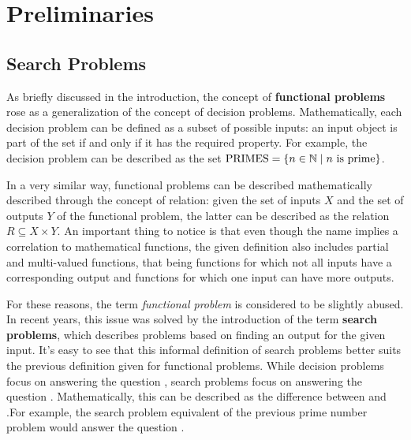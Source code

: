 \hypersetup{colorlinks=true, linkcolor=blue, citecolor=red}

\chapter{Preliminaries} \label{chap:preliminaries}

\section{Search Problems}

As briefly discussed in the introduction, the concept of \textbf{functional problems} rose as a generalization of the concept of decision problems. Mathematically, each decision problem can be defined as a subset of possible inputs: an input object is part of the set if and only if it has the required property. For example, the decision problem  can be described as the set $\mathrm{PRIMES} = \{n \in \mathbb{N} \mid n \text{ is prime}\}$.

In a very similar way, functional problems can be described mathematically described through the concept of relation: given the set of inputs $X$ and the set of outputs $Y$ of the functional problem, the latter can be described as the relation $R \subseteq X \times Y$. An important thing to notice is that even though the name implies a correlation to mathematical functions, the given definition also includes partial and multi-valued functions, that being functions for which not all inputs have a corresponding output and functions for which one input can have more outputs.

For these reasons, the term \textit{functional problem} is considered to be slightly abused. In recent years, this issue was solved by the introduction of the term \textbf{search problems}, which describes problems based on finding an output for the given input. It's easy to see that this informal definition of search problems better suits the previous definition given for functional problems. While decision problems focus on answering the question , search problems focus on answering the question . Mathematically, this can be described as the difference between  and .For example, the search problem equivalent of the previous prime number problem would answer the question . 

